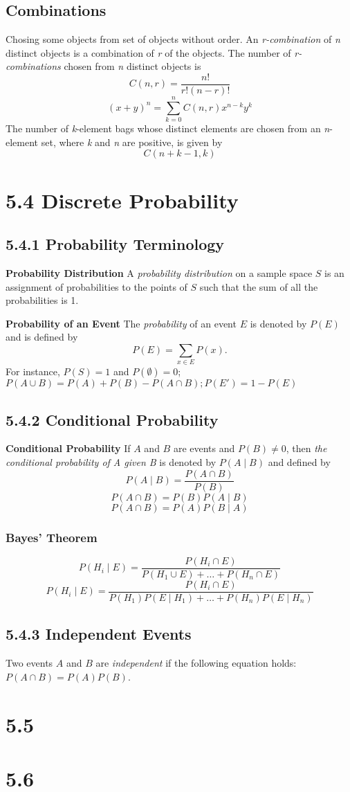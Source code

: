 \documentclass[10pt,twocolumn]{article}
\begin{document}
	\subsection*{Combinations}
	Chosing some objects from set of objects without order.
	An \textit{r-combination} of \textit{n} distinct objects is a combination of \textit{r} of the objects.  The number of \textit{r-combinations} chosen from \textit{n} distinct objects is
	\[C(n,r)=\frac{n!}{r!(n-r)!}\]
	\[(x+y)^n=\sum_{k=0}^nC(n,r)x^{n-k}y^k\]
	The number of \textit{k}-element bags whose distinct elements are chosen from an \textit{n}-element set, where \textit{k} and \textit{n} are positive, is given by
	\[C(n+k-1, k)\]


	\section*{5.4 Discrete Probability}

	\subsection*{5.4.1 Probability Terminology}

	\par\textbf{Probability Distribution} A \emph{probability distribution} on a sample space $S$ is an assignment of probabilities to the points of $S$ such that the sum of all the probabilities is 1.
	\par\noindent\textbf{Probability of an Event} The \emph{probability} of an event $E$ is denoted by $P(E)$ and is defined by
	\[P(E)=\sum_{x\in E}P(x).\]
	For instance, $P(S)=1$ and $P(\emptyset)=0$; $P(A\cup B)=P(A)+P(B)-P(A\cap B); P(E')=1-P(E)$
	
	\subsection*{5.4.2 Conditional Probability}
	
	\textbf{Conditional Probability} If $A$ and $B$ are events and $P(B)\neq0$, then \emph{the conditional probability of A given B} is denoted by $P(A\mid B)$ and defined by
	\[P(A\mid B)=\frac{P(A\cap B)}{P(B)}\]
	\[P(A\cap B)=P(B)P(A\mid B)\]
	\[P(A\cap B)=P(A)P(B\mid A)\]

	\subsubsection*{Bayes' Theorem}
	\[P(H_i\mid E)=\frac{P(H_i\cap E)}{P(H_1\cup E)+\ldots+P(H_n\cap E)}\]
	\[P(H_i\mid E)=\frac{P(H_i\cap E)}{P(H_1)P(E\mid H_1)+\ldots+P(H_n)P(E\mid  H_n)}\]
	
	\subsection*{5.4.3 Independent Events}
	
	Two events $A$ and $B$ are \emph{independent} if the following equation holds: $P(A \cap B)=P(A)P(B)$.
	
	
	
	\section*{5.5}
	
	\section*{5.6}
	
\end{document}
